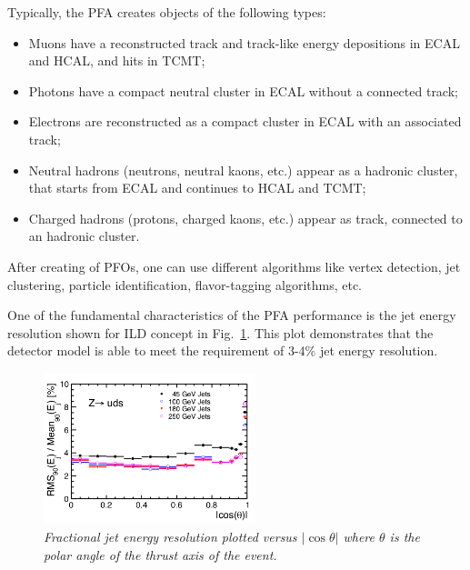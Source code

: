 Typically, the PFA creates objects of the following types:
\begin{itemize}
\item Muons have a reconstructed track and track-like energy depositions in ECAL and HCAL, and hits in TCMT;
\item Photons have a compact neutral cluster in ECAL without a connected track;
\item Electrons are reconstructed as a compact cluster in ECAL with an associated track;

\item Neutral hadrons (neutrons, neutral kaons, etc.) appear as a hadronic cluster, that starts from ECAL and continues to HCAL and TCMT;
\item Charged hadrons (protons, charged kaons, etc.) appear as track, connected to an hadronic cluster.
\end{itemize}

After creating of PFOs, one can use different algorithms like vertex detection, jet clustering, particle identification, flavor-tagging algorithms, etc.

One of the fundamental characteristics of the PFA performance is the jet energy resolution shown for ILD concept in Fig.~\ref{fig:ILCjetrms}. This plot demonstrates that the detector model is able to meet the requirement of 3-4\% jet energy resolution.

\begin{figure}[H]
{\centering
    \includegraphics[width=0.55\textwidth]{graphics/ILCjetrms.png}
    \caption{\sl Fractional jet energy resolution plotted versus $|\cos\theta|$ where $\theta$ is the polar angle of the thrust axis of the event.}
    \label{fig:ILCjetrms}
  }
\end{figure}




